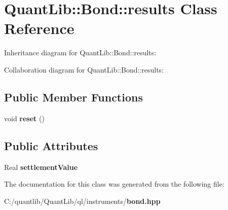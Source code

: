 \section{Quant\+Lib\+:\+:Bond\+:\+:results Class Reference}
\label{class_quant_lib_1_1_bond_1_1results}


Inheritance diagram for Quant\+Lib\+:\+:Bond\+:\+:results\+:


Collaboration diagram for Quant\+Lib\+:\+:Bond\+:\+:results\+:
\subsection*{Public Member Functions}
\begin{DoxyCompactItemize}
\item 
void {\bfseries reset} ()\label{class_quant_lib_1_1_bond_1_1results_aa998735b69f39399ab3600577e7b2f72}

\end{DoxyCompactItemize}
\subsection*{Public Attributes}
\begin{DoxyCompactItemize}
\item 
Real {\bfseries settlement\+Value}\label{class_quant_lib_1_1_bond_1_1results_aeab87724668063495333c542dad76ffe}

\end{DoxyCompactItemize}


The documentation for this class was generated from the following file\+:\begin{DoxyCompactItemize}
\item 
C\+:/quantlib/\+Quant\+Lib/ql/instruments/{\bf bond.\+hpp}\end{DoxyCompactItemize}
